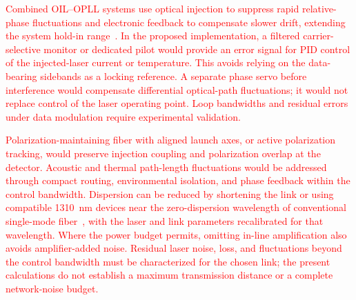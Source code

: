 \documentclass[
 aip,
 apl,
 amsmath,amssymb,
 preprint,
 floatfix,
]{revtex4-1}
\begin{document}
\textcolor{red}{Combined OIL--OPLL systems use optical injection to suppress rapid relative-phase fluctuations and electronic feedback to compensate slower drift, extending the system hold-in range~\cite{Bordonalli1999OIPLL}. In the proposed implementation, a filtered carrier-selective monitor or dedicated pilot would provide an error signal for PID control of the injected-laser current or temperature. This avoids relying on the data-bearing sidebands as a locking reference. A separate phase servo before interference would compensate differential optical-path fluctuations; it would not replace control of the laser operating point. Loop bandwidths and residual errors under data modulation require experimental validation.}

\textcolor{red}{Polarization-maintaining fiber with aligned launch axes, or active polarization tracking, would preserve injection coupling and polarization overlap at the detector. Acoustic and thermal path-length fluctuations would be addressed through compact routing, environmental isolation, and phase feedback within the control bandwidth. Dispersion can be reduced by shortening the link or using compatible 1310~nm devices near the zero-dispersion wavelength of conventional single-mode fiber~\cite{CorningSMF28Ultra}, with the laser and link parameters recalibrated for that wavelength. Where the power budget permits, omitting in-line amplification also avoids amplifier-added noise. Residual laser noise, loss, and fluctuations beyond the control bandwidth must be characterized for the chosen link; the present calculations do not establish a maximum transmission distance or a complete network-noise budget.}

\clearpage

\end{document}
